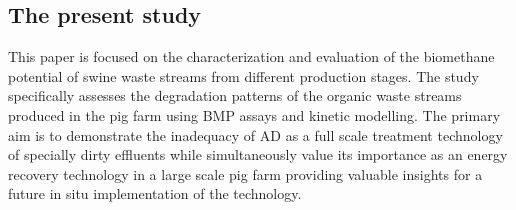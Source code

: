 \subsection{The present study}
This paper is focused on the characterization and evaluation of the biomethane potential of swine waste streams from different production stages. The study specifically assesses the degradation patterns of the organic waste streams produced in the pig farm using BMP assays and kinetic modelling. The primary aim is to demonstrate the inadequacy of AD as a full scale treatment technology of specially dirty effluents while simultaneously value its importance as an energy recovery technology in a large scale pig farm providing valuable insights for a future in situ implementation of the technology.